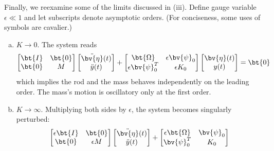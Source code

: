 \begin{enumerate}[(i)]
{    Finally, we reexamine some of the limits discussed in (iii). 
    Define gauge variable $\epsilon \ll 1$ and let subscripts denote asymptotic orders. 
    (For conciseness, some uses of symbols are cavalier.)
    \begin{enumerate}[(a)]
    \item {
        \emph{$K\rightarrow 0$}. 
        The system reads 
        \begin{equation}
            \begin{bmatrix}
                \bt{I} & \bt{0} \\ 
                \bt{0} & M
            \end{bmatrix} 
            \begin{bmatrix}
                \ddot{\bv{\eta}}(t) \\ \ddot{y}(t)
            \end{bmatrix} + 
            \begin{bmatrix}
                \bt{\Omega} & \epsilon \bv{\psi}_0 \\
                \epsilon \bv{\psi}_0^T & \epsilon K_0 
            \end{bmatrix}
            \begin{bmatrix}
                \bv{\eta}(t) \\ y(t)
            \end{bmatrix} = \bt{0}
        \end{equation}
        which implies the rod and the mass behaves independently on the leading order. 
        The mass's motion is oscillatory only at the first order. 
    } 
    \item {
        \emph{$K\rightarrow \infty$}. Multiplying both sides by $\epsilon$, the system becomes singularly perturbed:
        \begin{equation}
            \begin{bmatrix}
                \epsilon\bt{I} & \bt{0} \\ 
                \bt{0} & \epsilon M
            \end{bmatrix} 
            \begin{bmatrix}
                \ddot{\bv{\eta}}(t) \\ \ddot{y}(t)
            \end{bmatrix} + 
            \begin{bmatrix}
                \epsilon \bt{\Omega} & \bv{\psi}_0 \\
                \bv{\psi}_0^T & K_0 
            \end{bmatrix}

\end{equation}}
\end{enumerate}}
\end{enumerate}
